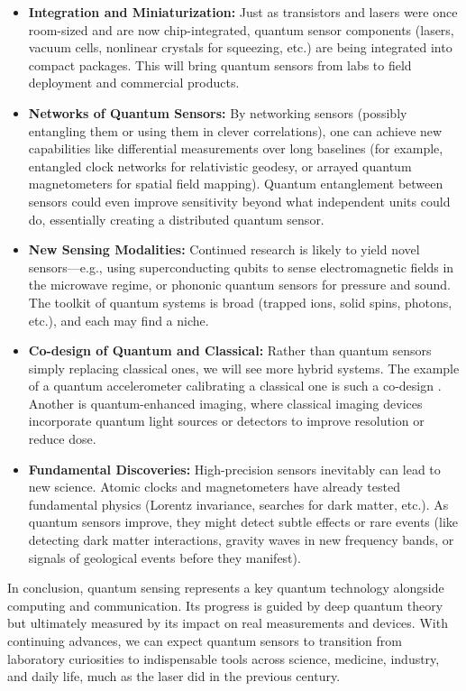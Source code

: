 \begin{itemize}

\item \textbf{Integration and Miniaturization:} Just as transistors and lasers were once room-sized and are now chip-integrated, quantum sensor components (lasers, vacuum cells, nonlinear crystals for squeezing, etc.) are being integrated into compact packages. This will bring quantum sensors from labs to field deployment and commercial products.

\item \textbf{Networks of Quantum Sensors:} By networking sensors (possibly entangling them or using them in clever correlations), one can achieve new capabilities like differential measurements over long baselines (for example, entangled clock networks for relativistic geodesy, or arrayed quantum magnetometers for spatial field mapping). Quantum entanglement between sensors could even improve sensitivity beyond what independent units could do, essentially creating a distributed quantum sensor.

\item \textbf{New Sensing Modalities:} Continued research is likely to yield novel sensors—e.g., using superconducting qubits to sense electromagnetic fields in the microwave regime, or phononic quantum sensors for pressure and sound. The toolkit of quantum systems is broad (trapped ions, solid spins, photons, etc.), and each may find a niche.

\item \textbf{Co-design of Quantum and Classical:} Rather than quantum sensors simply replacing classical ones, we will see more hybrid systems. The example of a quantum accelerometer calibrating a classical one is such a co-design . Another is quantum-enhanced imaging, where classical imaging devices incorporate quantum light sources or detectors to improve resolution or reduce dose.

\item \textbf{Fundamental Discoveries:} High-precision sensors inevitably can lead to new science. Atomic clocks and magnetometers have already tested fundamental physics (Lorentz invariance, searches for dark matter, etc.). As quantum sensors improve, they might detect subtle effects or rare events (like detecting dark matter interactions, gravity waves in new frequency bands, or signals of geological events before they manifest).

\end{itemize}



In conclusion, quantum sensing represents a key quantum technology
alongside computing and communication. Its progress is guided by deep
quantum theory but ultimately measured by its impact on real
measurements and devices. With continuing advances, we can expect
quantum sensors to transition from laboratory curiosities to
indispensable tools across science, medicine, industry, and daily
life, much as the laser did in the previous century.

